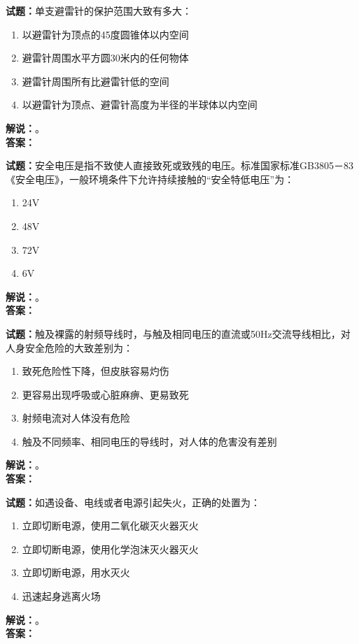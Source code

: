 \documentclass{ctexbook}
\begin{document}
\bigskip




\noindent\textbf{试题：}单支避雷针的保护范围大致有多大：
\begin{enumerate}[leftmargin=3em]
\item 以避雷针为顶点的45度圆锥体以内空间
\item 避雷针周围水平方圆30米内的任何物体
\item 避雷针周围所有比避雷针低的空间
\item 以避雷针为顶点、避雷针高度为半径的半球体以内空间
\end{enumerate}
\noindent\textbf{解说：}\textbf{}。\\\noindent\textbf{答案：}

\bigskip




\noindent\textbf{试题：}安全电压是指不致使人直接致死或致残的电压。标准国家标准GB3805－83《安全电压》，一般环境条件下允许持续接触的“安全特低电压”为：
\begin{enumerate}[leftmargin=3em]
\item 24V
\item 48V
\item 72V
\item 6V
\end{enumerate}
\noindent\textbf{解说：}\textbf{}。\\\noindent\textbf{答案：}

\bigskip




\noindent\textbf{试题：}触及裸露的射频导线时，与触及相同电压的直流或50Hz交流导线相比，对人身安全危险的大致差别为：
\begin{enumerate}[leftmargin=3em]
\item 致死危险性下降，但皮肤容易灼伤
\item 更容易出现呼吸或心脏麻痹、更易致死
\item 射频电流对人体没有危险
\item 触及不同频率、相同电压的导线时，对人体的危害没有差别
\end{enumerate}
\noindent\textbf{解说：}\textbf{}。\\\noindent\textbf{答案：}

\bigskip




\noindent\textbf{试题：}如遇设备、电线或者电源引起失火，正确的处置为：
\begin{enumerate}[leftmargin=3em]
\item 立即切断电源，使用二氧化碳灭火器灭火
\item 立即切断电源，使用化学泡沫灭火器灭火
\item 立即切断电源，用水灭火
\item 迅速起身逃离火场
\end{enumerate}
\noindent\textbf{解说：}\textbf{}。\\\noindent\textbf{答案：}
\end{document}
